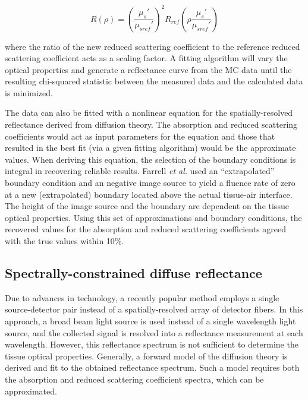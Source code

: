 \begin{equation}
	R(\rho) = \left(\frac{\mu_s'}{\mu_{sref}'}\right)^2 R_{ref}\left(\rho\frac{\mu_s'}{\mu_{sref}'}\right)
\end{equation}

\noindent where the ratio of the new reduced scattering coefficient to the reference reduced scattering coefficient acts as a scaling factor. A fitting algorithm will vary the optical properties and generate a reflectance curve from the MC data until the resulting chi-squared statistic between the measured data and the calculated data is minimized.

The data can also be fitted with a nonlinear equation for the spatially-resolved reflectance derived from diffusion theory. The absorption and reduced scattering coefficients would act as input parameters for the equation and those that resulted in the best fit (via a given fitting algorithm) would be the approximate values. When deriving this equation, the selection of the boundary conditions is integral in recovering reliable results. Farrell \emph{et al.}\cite{Farrell1992} used an ``extrapolated'' boundary condition and an negative image source to yield a fluence rate of zero at a new (extrapolated) boundary located above the actual tissue-air interface. The height of the image source and the boundary are dependent on the tissue optical properties. Using this set of approximations and boundary conditions, the recovered values for the absorption and reduced scattering coefficients agreed with the true values within 10\%.


\subsection{Spectrally-constrained diffuse reflectance}
\label{spec_diff_refl}
Due to advances in technology, a recently popular method employs a single source-detector pair instead of a spatially-resolved array of detector fibers. In this approach, a broad beam light source is used instead of a single wavelength light source, and the collected signal is resolved into a reflectance measurement at each wavelength. However, this reflectance spectrum is not sufficient to determine the tissue optical properties. Generally, a forward model of the diffusion theory is derived and fit to the obtained reflectance spectrum. Such a model requires both the absorption and reduced scattering coefficient spectra, which can be approximated.

